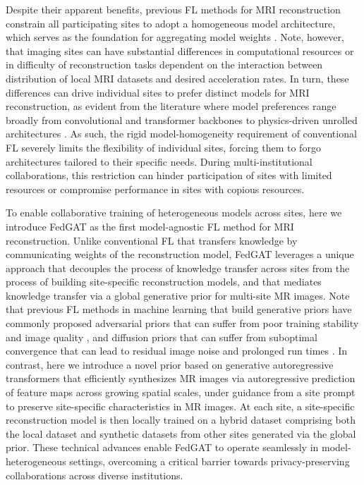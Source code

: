 Despite their apparent benefits, previous FL methods for MRI reconstruction constrain all participating sites to adopt a homogeneous model architecture, which serves as the foundation for aggregating model weights \cite{FedAvg}. Note, however, that imaging sites can have substantial differences in computational resources or in difficulty of reconstruction tasks dependent on the interaction between distribution of local MRI datasets and desired acceleration rates. In turn, these differences can drive individual sites to prefer distinct models for MRI reconstruction, as evident from the literature where model preferences range broadly from convolutional \cite{guo2021,GuoTMI2021,feng2023tmi} and transformer \cite{korkmaz2022unsupervised,MTrans,feng2023cvpr} backbones to physics-driven unrolled architectures \cite{MoDl,levac2023bio,wang2024fed,mambaroll}. As such, the rigid model-homogeneity requirement of conventional FL severely limits the flexibility of individual sites, forcing them to forgo architectures tailored to their specific needs. During multi-institutional collaborations, this restriction can hinder participation of sites with limited resources or compromise performance in sites with copious resources.

To enable collaborative training of heterogeneous models across sites, here we introduce FedGAT as the first model-agnostic FL method for MRI reconstruction. Unlike conventional FL that transfers knowledge by communicating weights of the reconstruction model, FedGAT leverages a unique approach that decouples the process of knowledge transfer across sites from the process of building site-specific reconstruction models, and that mediates knowledge transfer via a global generative prior for multi-site MR images. Note that previous FL methods in machine learning that build generative priors have commonly proposed adversarial priors that can suffer from poor training stability and image quality \cite{FedGAN,elmas2022federated}, and diffusion priors that can suffer from suboptimal convergence that can lead to residual image noise and prolonged run times \cite{FedDDA}. In contrast, here we introduce a novel prior based on generative autoregressive transformers that efficiently synthesizes MR images via autoregressive prediction of feature maps across growing spatial scales, under guidance from a site prompt to preserve site-specific characteristics in MR images. At each site, a site-specific reconstruction model is then locally trained on a hybrid dataset comprising both the local dataset and synthetic datasets from other sites generated via the global prior. These technical advances enable FedGAT to operate seamlessly in model-heterogeneous settings, overcoming a critical barrier towards privacy-preserving collaborations across diverse institutions.